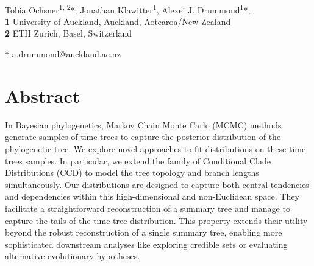 \documentclass[10pt,letterpaper]{article}
\begin{document}
\vspace*{0.2in}

\begin{flushleft}
{\Large
\textbf{} %
}
\newline
\\
Tobia Ochsner\textsuperscript{1, 2}*,
Jonathan Klawitter\textsuperscript{1},
Alexei J. Drummond\textsuperscript{1}*,
\\
\bigskip
\textbf{1} University of Auckland, Auckland, Aotearoa/New Zealand
\\
\textbf{2} ETH Zurich, Basel, Switzerland
\\
\bigskip

* a.drummond@auckland.ac.nz

\end{flushleft}
\section*{Abstract}
In Bayesian phylogenetics, Markov Chain Monte Carlo (MCMC) methods generate samples of time trees to capture the posterior distribution of the phylogenetic tree. We explore novel approaches to fit distributions on these time trees samples. In particular, we extend the family of Conditional Clade Distributions (CCD) to model the tree topology and branch lengths simultaneously. Our distributions are designed to capture both central tendencies and dependencies within this high-dimensional and non-Euclidean space. They facilitate a straightforward reconstruction of a summary tree and manage to capture the tails of the time tree distribution. This property extends their utility beyond the robust reconstruction of a single summary tree, enabling more sophisticated downstream analyses like exploring credible sets or evaluating alternative evolutionary hypotheses.


\end{document}
